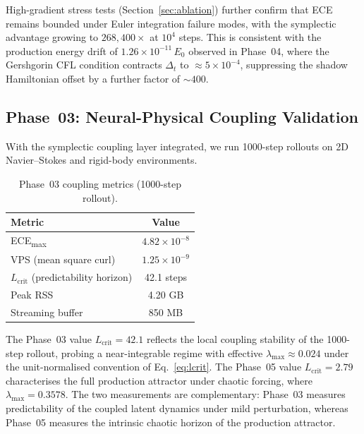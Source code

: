 \documentclass[10pt,twocolumn]{article}
\begin{document}
High-gradient stress tests (Section~\ref{sec:ablation})
further confirm that ECE remains bounded under Euler
integration failure modes, with the symplectic advantage
growing to $268{,}400\times$ at $10^4$ steps.
This is consistent with the production energy drift
of $1.26\times10^{-11}\,E_0$ observed in Phase~04,
where the Gershgorin CFL condition contracts $\Delta_t$
to ${\approx}5\times10^{-4}$, suppressing the shadow
Hamiltonian offset by a further factor of $\sim400$.

\subsection{Phase~03: Neural-Physical Coupling Validation}

With the symplectic coupling layer integrated, we run
1000-step rollouts on 2D Navier--Stokes and
rigid-body environments.
\begin{table}[h]
\centering
\caption{Phase~03 coupling metrics (1000-step rollout).}
\label{tab:phase03}
\small
\begin{tabular}{@{}lc@{}}
\toprule
\textbf{Metric} & \textbf{Value} \\
\midrule
ECE\textsubscript{max}                      & $4.82\times10^{-8}$ \\
VPS (mean square curl)                      & $1.25\times10^{-9}$ \\
$L_{\text{crit}}$ (predictability horizon)  & 42.1 steps \\
Peak RSS                                    & 4.20 GB \\
Streaming buffer                            & 850 MB \\
\bottomrule
\end{tabular}
\end{table}

The Phase~03 value $L_{\text{crit}}=42.1$ reflects the local coupling
stability of the 1000-step rollout, probing a near-integrable regime with
effective $\lambda_{\max}\approx0.024$ under the unit-normalised convention
of Eq.~\eqref{eq:lcrit}. The Phase~05 value
$L_{\text{crit}}=2.79$ characterises the full production attractor under
chaotic forcing, where $\lambda_{\max}=0.3578$.
The two measurements are complementary: Phase~03 measures predictability of
the coupled latent dynamics under mild perturbation, whereas Phase~05
measures the intrinsic chaotic horizon of the production attractor.
\end{document}
